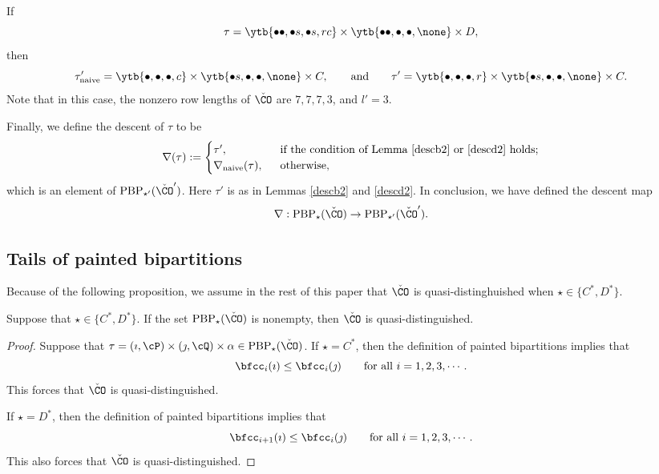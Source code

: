 \documentclass[ssunip]{subfiles}
\begin{document}
\begin{Example}
 If 
 \[
 \tau= \ytb{\bullet\bullet, \bullet s, \bullet s, r c} \times \ytb{\bullet\bullet,\bullet,\bullet, \none }\times 
  D,
 \]
 then 
\[
 \tau'_{\mathrm{naive}}=\ytb{\bullet, \bullet , \bullet ,  c} \times \ytb{\bullet s,\bullet,\bullet, \none } \times 
  C,\qquad\textrm{and}\qquad \tau'=\ytb{\bullet, \bullet , \bullet ,  r} \times \ytb{\bullet s,\bullet,\bullet, \none } \times
  C.
 \]
 Note that in this case, the nonzero row lengths of $\check \CO$ are $7,7,7,3$,   and $l'=3$.
\end{Example}

Finally, we define the descent of $\tau$ to be 
\[
  \nabla(\tau):= \begin{cases}
  \tau', & \ \text{ if the condition of Lemma \ref{descb2}  or \ref{descd2} holds}; \\
  \nabla_{\mathrm{naive}}( \tau), & \ \text{ otherwise},
\end{cases}
\]
which is an element of $  \mathrm{PBP}_{\star'}(\check \CO')$. 
Here $\tau'$ is as in Lemmas  \ref{descb2} and \ref{descd2}. In conclusion, we have defined the descent map
\[
\nabla: \mathrm{PBP}_{\star}(\check \CO)\rightarrow \mathrm{PBP}_{\star'}(\check \CO').
\]


\subsection{Tails of painted bipartitions}
Because of the following proposition, we assume in the rest of this paper that $\check \CO$ is quasi-distinghuished  when $\star\in \{C^*, D^*\}$. 
 

\begin{prop}
  Suppose that $\star\in \{C^*, D^*\}$. If the set $\mathrm{PBP}_\star(\check \CO)$ is nonempty, then $\check \CO$ is quasi-distinguished.  
\end{prop}
\begin{proof}
  Suppose that $\tau=(\imath,\cP)\times(\jmath,\cQ)\times \alpha \in  \mathrm{PBP}_\star(\check \CO)$. If  $\star=C^*$, then  the definition of painted bipartitions implies that 
 \[
 \bfcc_i(\imath)\leq \bfcc_i(\jmath) \qquad \textrm{for all } i=1,2,3, \cdots.
 \]
This forces that $\check \CO$ is quasi-distinguished. 
 
 If  $\star=D^*$, then  the definition of painted bipartitions implies that 
 \[
 \bfcc_{i+1}(\imath)\leq \bfcc_i(\jmath) \qquad \textrm{for all } i=1,2,3, \cdots.
 \]
This  also forces that   $\check \CO$ is quasi-distinguished.
 \end{proof}
\end{document}
